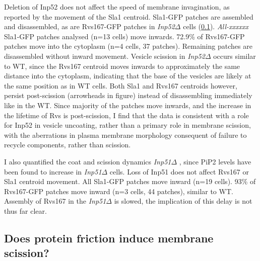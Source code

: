 	\vspace{5mm}
	Deletion of Inp52 does not affect the speed of membrane invagination, as reported by the movement of the Sla1 centroid. Sla1-GFP patches are assembled and disassembled, as are Rvs167-GFP patches in \textit{Inp52$\Delta$ } cells (\ref{}). \textit{All-xxxxxx} Sla1-GFP patches analysed (n=13 cells) move inwards. 72.9\% of Rvs167-GFP patches move into the cytoplasm (n=4 cells, 37 patches). Remaining patches are disassembled without inward movement. Vesicle scission in \textit{Inp52$\Delta$ }occurs similar to WT, since the Rvs167 centroid moves inwards to approximately the same distance into the cytoplasm, indicating that the base of the vesicles are likely at the same position as in WT cells. Both Sla1 and Rvs167 centroids however, persist post-scission (arrowheads in figure) instead of disassembling immediately like in the WT. Since majority of the patches move inwards, and the increase in the lifetime of Rvs is post-scission, I find that the data is consistent with a role for Inp52 in vesicle uncoating, rather than a primary role in membrane scission, with the aberrations in plasma membrane morphology consequent of failure to recycle components, rather than scission. 
	


	\vspace{5mm}
	I also quantified the coat and scission dynamics \textit{Inp51$\Delta$ }, since PiP2 levels have been found to increase in \textit{Inp51$\Delta$ } cells. Loss of Inp51 does not affect Rvs167 or Sla1 centroid movement. All Sla1-GFP patches move inward (n=19 cells). 93\% of Rvs167-GFP patches move inward (n=3 cells, 44 patches), similar to WT. Assembly of Rvs167 in the \textit{Inp51$\Delta$ }is slowed, the implication of this delay is not thus far clear. 


	
	\subsection{Does protein friction induce membrane scission? }
	
